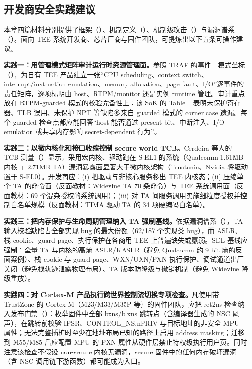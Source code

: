 \documentclass[11pt]{ctexart}
\begin{document}
\subsection{开发商安全实践建议}
本章四篇材料分别提供了框架（\cite{li2024sokteechoices}）、机制定义（\cite{arm_trustzone_whitepaper}）、机制级攻击（\cite{ma2023ret2ns}）与漏洞谱系（\cite{cerdeira2020trustzone}）。面向 TEE 系统开发商、芯片厂商与固件团队，可提炼出以下五条可操作建议。\par
\noindent\textbf{实践一：用管理模式矩阵审计运行时资源管理面。}参照 TRAF 的事件—模式坐标（\cite{li2024sokteechoices}），为自有 TEE 产品建立一张``CPU scheduling、context switch、interrupt/instruction emulation、memory allocation、page fault、I/O''逐事件的责任矩阵，逐项标明由 host、RTPM/monitor 还是实例 runtime 管理。审计重点放在 RTPM-guarded 模式的校验完备性上：该 SoK 的 Table 1 表明未保护寄存器、TLB 误用、未保护 NPT 等缺陷多来自 guarded 模式的 corner case 遗漏。每个 guarded 检查点都应能回答``host 能否通过 present bit、中断注入、I/O emulation 或共享内存影响 secret-dependent 行为''。\par
\noindent\textbf{实践二：以微内核化和接口收缩控制 secure world TCB。}Cerdeira 等人的 TCB 测量（\cite{cerdeira2020trustzone}）显示，采用宏内核、驱动跑在 S-EL1 的系统（Qualcomm 1.61MB 内核 + 2.71MB TA）漏洞暴露面显著大于微内核架构（Trustonic、Nvidia 将驱动置于 S-EL0）。开发商应：(i) 把驱动与非核心服务移出 TEE 内核态；(ii) 压缩单个 TA 的命令面（反面教材：Widevine TA 70 条命令）与 TEE 系统调用面（反面教材：69 个混杂授权的系统调用）；(iii) 对 TA 间服务调用实施细粒度授权并控制白名单规模（反面教材：TIMA 驱动 TA 的 34 项硬编码白名单）。\par
\noindent\textbf{实践三：把内存保护与生命周期管理纳入 TA 强制基线。}依据漏洞谱系（\cite{cerdeira2020trustzone}），TA 输入校验缺陷占全部实现 bug 的最大份额（62/187 个实现类 bug），而 ASLR、栈 cookie、guard page、执行保护在各商用 TEE 上普遍缺失或羸弱。SDL 基线应强制：全量 TA 与内核的高熵 ASLR/KASLR（避免 Qualcomm 约 9 bit 熵的反面案例）、栈 cookie 与 guard page、WXN/UXN/PXN 执行保护、调试通道出厂关闭（避免栈轨迹泄露物理布局）、TA 版本防降级与撤销机制（避免 Widevine 降级重放）。\par
\noindent\textbf{实践四：对 Cortex-M 产品执行跨世界控制流切换专项检查。}凡使用带 TrustZone 的 Cortex-M（M23/M33/M35P 等）的固件团队，应把 ret2ns 检查纳入发布门禁（\cite{ma2023ret2ns}）：枚举固件中全部 bxns/blxns 跳转点（含编译器生成的 NSC 尾声），在跳转前校验 IPSR、CONTROL\_NS.nPRIV 与目标地址的非安全 MPU 属性；无法完整插桩时至少在地址布局已知的路径上启用 address masking；迁移到 M55/M85 后应配置 MPU 的 PXN 属性从硬件层禁止特权级执行用户页。同时注意该检查不假设 non-secure 内核无漏洞，secure 固件中的任何内存破坏漏洞（含 NSC 调用链下游函数）都可能成为入口。\par
\end{document}
